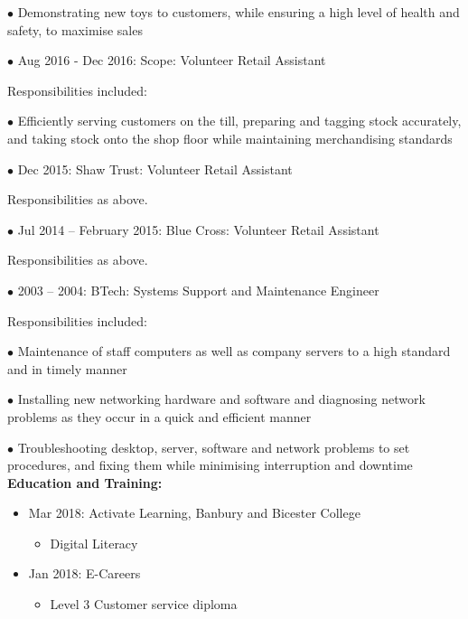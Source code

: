 \documentclass[10pt,a4paper]{book}
\begin{document}
\begin{flushleft}
  \item[$\bullet$]Demonstrating new toys to customers, while ensuring a high level of health and safety, to maximise sales
\linebreak{}
  \item[$\bullet$]Aug 2016 - Dec 2016: Scope: Volunteer Retail Assistant

Responsibilities included:

  \item[$\bullet$]Efficiently serving customers on the till, preparing and tagging stock accurately, and taking stock onto the shop floor while maintaining merchandising standards
\linebreak{}
  \item[$\bullet$]Dec 2015: Shaw Trust: Volunteer Retail Assistant

Responsibilities as above.
\linebreak{}
  \item[$\bullet$]Jul 2014 -- February 2015: Blue Cross: Volunteer Retail Assistant

Responsibilities as above.
\linebreak{}
\item[$\bullet$]2003 -- 2004: BTech: Systems Support and Maintenance Engineer
  
Responsibilities included:

  \item[$\bullet$]Maintenance of staff computers as well as company servers to a high standard and in timely manner

  \item[$\bullet$]Installing new networking hardware and software and diagnosing network problems as they occur in a quick and efficient manner

  \item[$\bullet$]Troubleshooting desktop, server, software and network problems to set procedures, and fixing them while minimising interruption and downtime
    \linebreak{}
\linebreak{}
\textbf {Education and Training:}
\begin{itemize}
  \item Mar 2018: Activate Learning, Banbury and Bicester College
    \begin{itemize}
    \item Digital Literacy
  \end{itemize}
\end{itemize}
\begin{itemize}
  \item Jan 2018: E-Careers
    \begin{itemize}
    \item Level 3 Customer service diploma


\end{itemize}
\end{itemize}
\end{flushleft}
\end{document}
